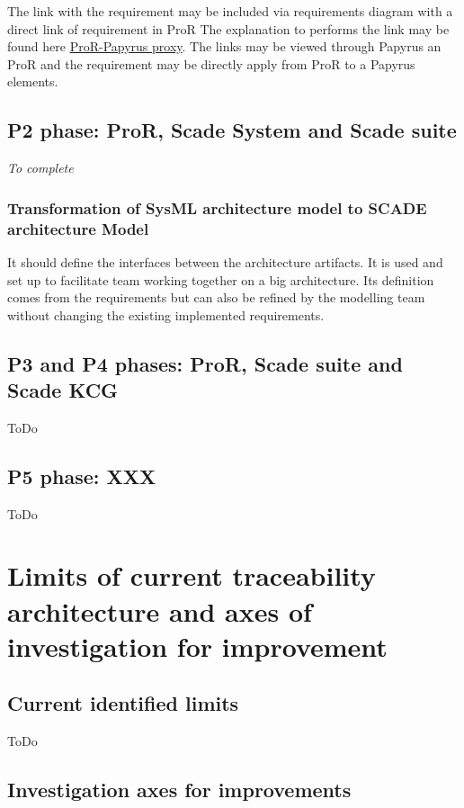 \documentclass[11pt]{template/openetcs_report}
\begin{document}
The link with the requirement may be included via requirements diagram with a
direct link of requirement in ProR
The explanation to performs the link may be found here \href{https://github.com/openETCS/toolchain/wiki/User-Documentation#tracing-requirements-and-sysml-models}{ProR-Papyrus proxy}.
The links may be viewed through Papyrus an ProR and the requirement may be
directly apply from ProR to a Papyrus elements.


\section{P2 phase: ProR, Scade System and Scade suite}

\textit{To complete}

\subsection{Transformation of SysML architecture model to SCADE architecture Model}
\label{sec-9}

It should define the interfaces between the architecture artifacts.  It is used and
set up to facilitate team working together on a big architecture. Its definition
comes from the requirements but can also be refined by the modelling team without
changing the existing implemented requirements.


\section{P3 and P4 phases: ProR, Scade suite and Scade KCG}
ToDo

\section{P5 phase: XXX}
ToDo

\chapter{Limits of current traceability architecture and axes of investigation for improvement}
\label{sec-6}

\section{Current identified limits}
ToDo

\section{Investigation axes for improvements}
\end{document}
